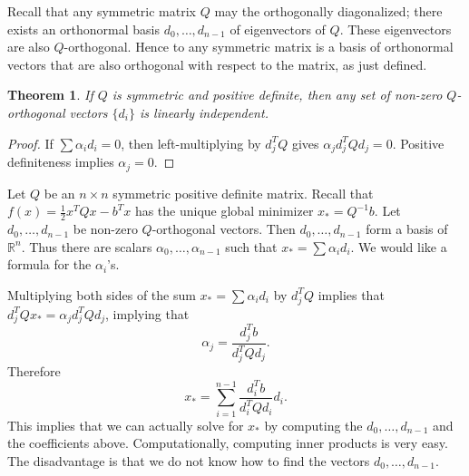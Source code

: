 \documentclass[11pt]{book}
\newcommand{\R}{\mathbb{R}}
\newtheorem{theorem}{Theorem}[subsection]
\begin{document}
Recall that any symmetric matrix $Q$ may the orthogonally diagonalized; there exists an orthonormal basis $d_0, \dots, d_{n-1}$ of eigenvectors of $Q$. These eigenvectors are also $Q$-orthogonal. Hence to any symmetric matrix is a basis of orthonormal vectors that are also orthogonal with respect to the matrix, as just defined.

\begin{theorem}
If $Q$ is symmetric and positive definite, then any set of non-zero $Q$-orthogonal vectors $\{d_i\}$ is linearly independent.
\end{theorem}
\begin{proof}
If $\sum \alpha_i d_i = 0$, then left-multiplying by $d_j^TQ$ gives $\alpha_j d_j^T Q d_j = 0$. Positive definiteness implies $\alpha_j = 0$. 
\end{proof}

Let $Q$ be an $n \times n$ symmetric positive definite matrix. Recall that $f(x) = \frac{1}{2}x^TQx - b^Tx$ has the unique global minimizer $x_* = Q^{-1}b$. Let $d_0, \dots, d_{n-1}$ be non-zero $Q$-orthogonal vectors. Then $d_0, \dots, d_{n-1}$ form a basis of $\R^n$. Thus there are scalars $\alpha_0, \dots, \alpha_{n-1}$ such that $x_* = \sum \alpha_i d_i$. We would like a formula for the $\alpha_i$'s.

Multiplying both sides of the sum $x_* = \sum \alpha_i d_i$ by $d_j^TQ$ implies that $d_j^TQx_* = \alpha_j d_j^TQd_j$, implying that
\[
\alpha_j = \frac{d_j^T b}{d_j^TQd_j}.
\]
Therefore
\[
x_* = \sum_{i=1}^{n-1} \frac{d_i^Tb}{d_i^TQd_i}  d_i.
\]
This implies that we can actually solve for $x_*$ by computing the $d_0, \dots, d_{n-1}$ and the coefficients above. Computationally, computing inner products is very easy. The disadvantage is that we do not know how to find the vectors $d_0, \dots, d_{n-1}$.
\end{document}
